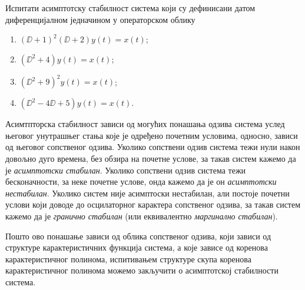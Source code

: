 \PID \mnImportant
Испитати асимптотску стабилност система који су дефинисани датом диференцијалном једначином у операторском облику
\begin{multicols}{2}
    \begin{enumerate}[label=(\alph*)]
    \item $(\DD + 1)^2(\DD + 2)y(t) = x(t)$;
    \item $(\DD^2 + 4)y(t) = x(t)$;
    \item $(\DD^2 + 9)^2 y(t) = x(t)$;
    \item $(\DD^2 - 4\DD + 5) y(t) = x(t)$.
    \end{enumerate}
\end{multicols} \noindent

\RESENJE
Асимтпторска стабилност зависи од могућих понашања одзива система услед његовог унутрашњег стања које је одређено почетним условима, односно, 
зависи од његовог сопственог одзива. Уколико сопствени одзив система тежи нули након довољно дуго времена, без обзира на почетне услове, 
за такав систем кажемо да је \textit{асимптотски стабилан}. Уколико сопствени одзив система тежи бесконачности, за неке почетне услове, онда кажемо 
да је он \textit{асимптотски нестабилан}. Уколико систем није асимптоски нестабилан, али постоје почетни услови који доводе до осцилаторног карактера 
сопственог одзива, за такав систем кажемо да је \textit{гранично стабилан} (или еквивалентно \textit{маргинално стабилан}).

Пошто ово понашање зависи од облика сопственог одзива, који зависи од структуре карактеристичних функција система, а које зависе од коренова карактеристичног
полинома, испитивањем структуре скупа коренова карактеристичног полинома можемо закључити о асимптотској стабилности система. 

